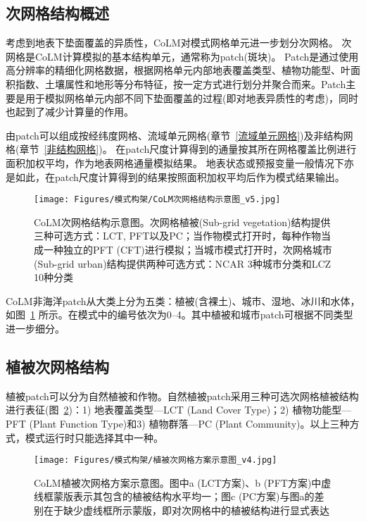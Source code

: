 \subsection{次网格结构概述}
考虑到地表下垫面覆盖的异质性，CoLM对模式网格单元进一步划分次网格。
次网格是CoLM计算模拟的基本结构单元，通常称为patch(斑块)。
Patch是通过使用高分辨率的精细化网格数据，根据网格单元内部地表覆盖类型、植物功能型、叶面积指数、土壤属性和地形等分布特征，按一定方式进行划分并聚合而来。Patch主要是用于模拟网格单元内部不同下垫面覆盖的过程(即对地表异质性的考虑)，同时也起到了减少计算量的作用。


由patch可以组成按经纬度网格、流域单元网格(章节~\ref{流域单元网格})及非结构网格(章节~\ref{非结构网格})。
在patch尺度计算得到的通量按其所在网格覆盖比例进行面积加权平均，作为地表网格通量模拟结果。
地表状态或预报变量一般情况下亦是如此，在patch尺度计算得到的结果按照面积加权平均后作为模式结果输出。

{
  \begin{figure}[htbp]
    \centering
    \texttt{[image: Figures/模式构架/CoLM次网格结构示意图\_v5.jpg]}
    \caption[CoLM次网格结构示意图]{CoLM次网格结构示意图。次网格植被(Sub-grid vegetation)结构提供三种可选方式：LCT, PFT以及PC；当作物模式打开时，每种作物当成一种独立的PFT (CFT)进行模拟；当城市模式打开时，次网格城市(Sub-grid urban)结构提供两种可选方式：NCAR 3种城市分类和LCZ 10种分类}
    \label{fig:次网格结构示意图}
  \end{figure}
}


CoLM非海洋patch从大类上分为五类：植被(含裸土)、城市、湿地、冰川和水体，如图~\ref{fig:次网格结构示意图} 所示。在模式中的编号依次为0--4。其中植被和城市patch可根据不同类型进一步细分。

\subsection{植被次网格结构}\label{sec:植被次网格}
植被patch可以分为自然植被和作物。自然植被patch采用三种可选次网格植被结构进行表征(图~\ref{fig:植被次网格方案})：1) 地表覆盖类型---LCT (Land Cover Type)；2) 植物功能型---PFT (Plant Function Type)和3) 植物群落---PC (Plant Community)。以上三种方式，模式运行时只能选择其中一种。

{
  \begin{figure}[htbp]
    \centering
    \texttt{[image: Figures/模式构架/植被次网格方案示意图\_v4.jpg]}
    \caption[CoLM植被次网格方案示意图]{CoLM植被次网格方案示意图。图中a (LCT方案)、b (PFT方案)中虚线框蒙版表示其包含的植被结构水平均一；图c (PC方案)与图a的差别在于缺少虚线框所示蒙版，即对次网格中的植被结构进行显式表达}
    \label{fig:植被次网格方案}
  \end{figure}
}

